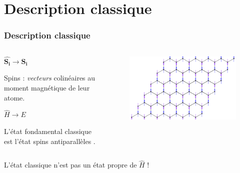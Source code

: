 \documentclass[xcolor=dvipsnames]{beamer}
\newcommand{\h}{\ensuremath{\hat{H}}\xspace}
\newcommand{\1}{\ensuremath{\ket{\om_1\bom_1}}\xspace}
\newcommand{\2}{\ensuremath{\ket{\om_2\bom_2}}\xspace}
\begin{document}
\section{Description classique}
\begin{frame}
\frametitle{Description classique}

\begin{columns}[t]
  \begin{column}{5cm}
  \begin{center}
$\hat{\mathbf{S_i}} \rightarrow \mathbf{S_i}$
\end{center}
Spins : \emph{vecteurs} colinéaires au moment magnétique de leur atome.

\begin{center}
$\h \rightarrow E$
\end{center}

L'état fondamental classique est l'état \og spins antiparallèles \fg{}.

  \end{column}
  
  \begin{column}{5cm}
  \begin{figure}[htp]
	\centering
	\includegraphics[scale=0.60]{vector_img/spins_struc_nid_abeilles.pdf}
	\end{figure} 
  \end{column}
 \end{columns}

\begin{columns}
\begin{column}{5cm}
\begin{alertblock}{}
L'état classique n'est pas un état propre de $\h$ !
\end{alertblock}
\end{column}
\end{columns}

\end{frame}
\end{document}
